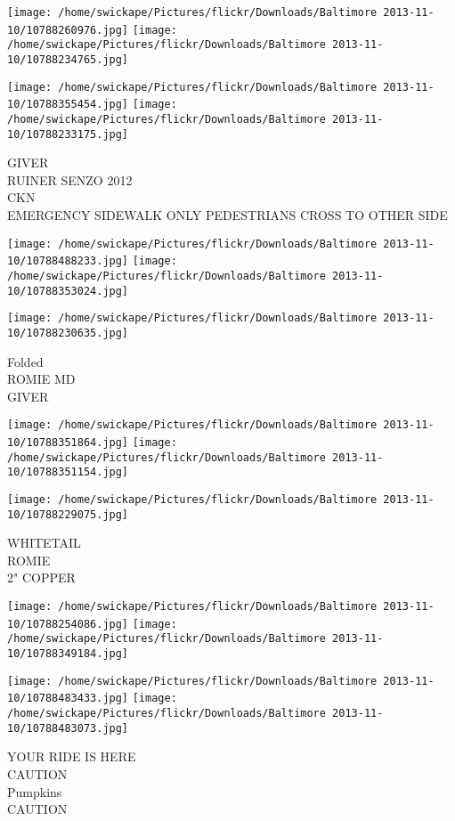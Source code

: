 \documentclass[10pt,letterpaper]{article}
\begin{document}
\texttt{[image: /home/swickape/Pictures/flickr/Downloads/Baltimore 2013-11-10/10788260976.jpg]}
\texttt{[image: /home/swickape/Pictures/flickr/Downloads/Baltimore 2013-11-10/10788234765.jpg]}

\texttt{[image: /home/swickape/Pictures/flickr/Downloads/Baltimore 2013-11-10/10788355454.jpg]}
\texttt{[image: /home/swickape/Pictures/flickr/Downloads/Baltimore 2013-11-10/10788233175.jpg]}

GIVER\\
RUINER SENZO 2012\\
CKN\\
EMERGENCY SIDEWALK ONLY PEDESTRIANS CROSS TO OTHER SIDE
\pagebreak

\texttt{[image: /home/swickape/Pictures/flickr/Downloads/Baltimore 2013-11-10/10788488233.jpg]}
\texttt{[image: /home/swickape/Pictures/flickr/Downloads/Baltimore 2013-11-10/10788353024.jpg]}

\vspace{0.25in}
\texttt{[image: /home/swickape/Pictures/flickr/Downloads/Baltimore 2013-11-10/10788230635.jpg]}

Folded\\
ROMIE MD\\
GIVER
\pagebreak

\texttt{[image: /home/swickape/Pictures/flickr/Downloads/Baltimore 2013-11-10/10788351864.jpg]}
\texttt{[image: /home/swickape/Pictures/flickr/Downloads/Baltimore 2013-11-10/10788351154.jpg]}

\vspace{0.25in}
\texttt{[image: /home/swickape/Pictures/flickr/Downloads/Baltimore 2013-11-10/10788229075.jpg]}

WHITETAIL\\
ROMIE\\
2" COPPER
\pagebreak

\texttt{[image: /home/swickape/Pictures/flickr/Downloads/Baltimore 2013-11-10/10788254086.jpg]}
\texttt{[image: /home/swickape/Pictures/flickr/Downloads/Baltimore 2013-11-10/10788349184.jpg]}

\texttt{[image: /home/swickape/Pictures/flickr/Downloads/Baltimore 2013-11-10/10788483433.jpg]}
\texttt{[image: /home/swickape/Pictures/flickr/Downloads/Baltimore 2013-11-10/10788483073.jpg]}

YOUR RIDE IS HERE\\
CAUTION\\
Pumpkins\\
CAUTION
\pagebreak
\end{document}
